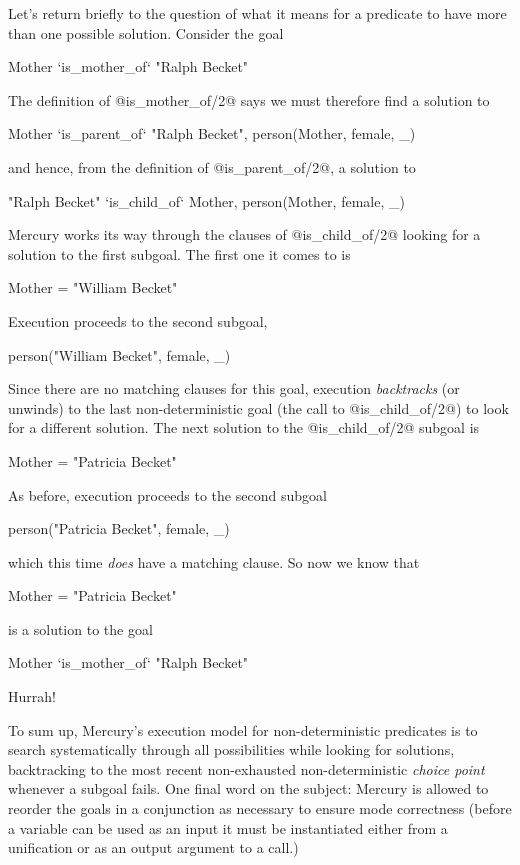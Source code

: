 Let's return briefly to the question of what it means for a predicate
to have more than one possible solution.  Consider the goal
\begin{myverbatim}
    Mother `is_mother_of` "Ralph Becket"
\end{myverbatim}
The definition of @is_mother_of/2@ says we must therefore find a solution to
\begin{myverbatim}
    Mother `is_parent_of` "Ralph Becket",
    person(Mother, female, _)
\end{myverbatim}
and hence, from the definition of @is_parent_of/2@, a solution to
\begin{myverbatim}
    "Ralph Becket" `is_child_of` Mother,
    person(Mother, female, _)
\end{myverbatim}
Mercury works its way through the clauses of @is_child_of/2@ looking for a
solution to the first subgoal.  The first one it comes
to is
\begin{myverbatim}
    Mother = "William Becket"
\end{myverbatim}
Execution proceeds to the second subgoal,
\begin{myverbatim}
    person("William Becket", female, _)
\end{myverbatim}
Since there are no matching clauses for this goal, execution
\emph{backtracks} (or unwinds) to the
last non-deterministic goal (the call to @is_child_of/2@) to look for a
different solution.  The next solution to the @is_child_of/2@ subgoal is
\begin{myverbatim}
    Mother = "Patricia Becket"
\end{myverbatim}
As before, execution proceeds to the second subgoal
\begin{myverbatim}
    person("Patricia Becket", female, _)
\end{myverbatim}
which this time \emph{does} have a matching clause.  So now we know that
\begin{myverbatim}
    Mother = "Patricia Becket"
\end{myverbatim}
is a solution to the goal
\begin{myverbatim}
    Mother `is_mother_of` "Ralph Becket"
\end{myverbatim}
Hurrah!

To sum up, Mercury's execution model for non-deterministic
predicates is to search systematically through all possibilities while
looking for solutions, backtracking to the most recent non-exhausted
non-deterministic \emph{choice point} whenever a subgoal fails.  One final
word on the subject: Mercury is allowed to reorder the goals in a
conjunction as necessary to ensure mode correctness (\ie before a variable
can be used as an input it must be instantiated either from a unification or
as an output argument to a call.)

